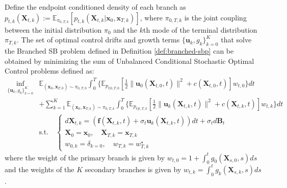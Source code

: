 \documentclass{article}
\begin{document}
\begin{proposition}
    Define the endpoint conditioned density of each branch as $p_{t, k}(\boldsymbol{X}_{t, k}):=\mathbb{E}_{\pi_{0,T,k}}[p_{t,k}(\boldsymbol{X}_{t,k}|\boldsymbol{x}_0, \boldsymbol{x}_{T,k})]$, where $\pi_{0,T, k}$ is the joint coupling between the initial distribution $\pi_0$ and the $k$th mode of the terminal distribution $\pi_{T,k}$. The set of optimal control drifts and growth terms $\{\boldsymbol{u}_{k}, g_{k}\}_{k=0}^K$ that solve the Branched SB problem defined in Definition \ref{def:branched-sbp} can be obtained by minimizing the sum of Unbalanced Conditional Stochastic Optimal Control problems defined as:
    \begin{align}
        \inf_{\{\boldsymbol{u}_{k},g_{k}\}_{k=0}^K}&\mathbb{E}_{(\boldsymbol{x}_0, \boldsymbol{x}_{T, 0})\sim \pi_{0,T,0}}\int_0^T\bigg\{\mathbb{E}_{p_{t|0,T, 0}}\left[\frac{1}{2}\|\boldsymbol{u}_{0}(\boldsymbol{X}_{t,0},t)\|^2+c(\boldsymbol{X}_{t,0},t)\right]w_{t,0}\bigg\}dt\\
        &+\sum_{k=1}^K\mathbb{E}_{(\boldsymbol{x}_0, \boldsymbol{x}_{T,k})\sim \pi_{0,T,k}}\int_0^T \bigg\{\mathbb{E}_{p_{t|0,T, k}}\left[\frac{1}{2}\|\boldsymbol{u}_{k}(\boldsymbol{X}_{t, k},t)\|^2+c(\boldsymbol{X}_{t,k},t)\right]w_{t, k}\bigg\}dt\nonumber\\
        &\text{s.t.}\quad\begin{cases}
            d\boldsymbol{X}_{t,k}=(\boldsymbol{f}(\boldsymbol{X}_{t,k},t)+\sigma_t\boldsymbol{u}_{k}(\boldsymbol{X}_{t,k},t))dt +\sigma_td\boldsymbol{B}_t\\
            \boldsymbol{X}_0=\boldsymbol{x}_0, \quad \boldsymbol{X}_{T, k}=\boldsymbol{x}_{T, k}\\
            w_{0, k}=\delta_{k=0}, \quad w_{T, k}=w^\star_{T,k}
        \end{cases}\nonumber
    \end{align}
    where the weight of the primary branch is given by $w_{t, 0}=1+\int_0^tg_0(\boldsymbol{X}_{s,0},s)ds$ and the weights of the $K$ secondary branches is given by $w_{t, k}=\int_0^tg_k(\boldsymbol{X}_{s,k},s)ds$.
\end{proposition}
\end{document}
